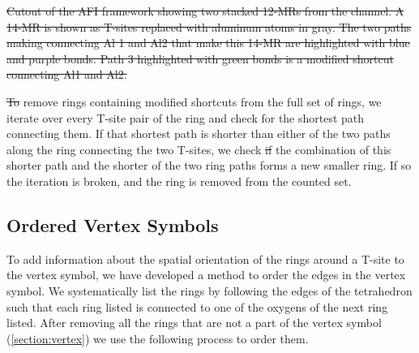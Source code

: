 \documentclass[preprint,numrefs,noinfo,sort&compress]{elsarticle}
\providecommand{\DIFadd}[1]{{\protect\color{blue}\uwave{#1}}} %
\providecommand{\DIFdel}[1]{{\protect\color{red}\sout{#1}}}                      %
\providecommand{\DIFaddbegin}{} %
\providecommand{\DIFaddend}{} %
\providecommand{\DIFdelbegin}{} %
\providecommand{\DIFdelend}{} %
\providecommand{\DIFdelFL}[1]{\DIFdel{#1}} %
\newcommand{\DIFscaledelfig}{0.5}
\newlength{\DIFdelgraphicswidth} %
\newlength{\DIFdelgraphicsheight} %
\newcommand{\DIFaddincludegraphics}[2][]{{\color{blue}\fbox{\DIFOincludegraphics[#1]{#2}}}} %
\newcommand{\DIFdelincludegraphics}[2][]{%
\sbox{\DIFdelgraphicsbox}{\DIFOincludegraphics[#1]{#2}}%
\settoboxwidth{\DIFdelgraphicswidth}{\DIFdelgraphicsbox} %
\settoboxtotalheight{\DIFdelgraphicsheight}{\DIFdelgraphicsbox} %
\scalebox{\DIFscaledelfig}{%
\parbox[b]{\DIFdelgraphicswidth}{\usebox{\DIFdelgraphicsbox}\\[-\baselineskip] \rule{\DIFdelgraphicswidth}{0em}}\llap{\resizebox{\DIFdelgraphicswidth}{\DIFdelgraphicsheight}{%
\setlength{\unitlength}{\DIFdelgraphicswidth}%
\begin{picture}(1,1)%
\thicklines\linethickness{2pt} %
{\color[rgb]{1,0,0}\put(0,0){\framebox(1,1){}}}%
{\color[rgb]{1,0,0}\put(0,0){\line( 1,1){1}}}%
{\color[rgb]{1,0,0}\put(0,1){\line(1,-1){1}}}%
\end{picture}%
}\hspace*{3pt}}} %
} %
\DeclareRobustCommand{\DIFaddbegin}{\DIFOaddbegin \let\includegraphics\DIFaddincludegraphics} %
\DeclareRobustCommand{\DIFaddend}{\DIFOaddend \let\includegraphics\DIFOincludegraphics} %
\DeclareRobustCommand{\DIFdelbegin}{\DIFOdelbegin \let\includegraphics\DIFdelincludegraphics} %
\DeclareRobustCommand{\DIFdelend}{\DIFOaddend \let\includegraphics\DIFOincludegraphics} %
\begin{document}
\DIFdelbegin %
{%
\DIFdelFL{Cutout of the AFI framework showing two stacked 12-MRs from the channel. A 14-MR is shown as T-sites replaced with aluminum atoms in gray. The two paths making connecting Al 1 and Al2 that make this 14-MR are highlighted with blue and purple bonds. Path 3 highlighted with green bonds is a modified shortcut connecting Al1 and Al2. }%
}

\DIFdel{To }\DIFdelend \DIFaddbegin \DIFadd{Algorithmically, to }\DIFaddend remove rings containing modified shortcuts from the full set of rings, we iterate over every T-site pair of the ring and check for the shortest path connecting them. If that shortest path is shorter than either of the two paths along the ring connecting the two T-sites, we check \DIFdelbegin \DIFdel{if }\DIFdelend \DIFaddbegin \DIFadd{whether }\DIFaddend the combination of this shorter path and the shorter of the two ring paths forms a new smaller ring. If so the iteration is broken, and the ring is removed from the counted set. 

\subsection{Ordered Vertex Symbols \label{section:ov}}
\DIFdelbegin %
\DIFdelend \DIFaddbegin \label{sec:org7db42da}
\DIFaddend 

To add information about the spatial orientation of the rings around a T-site to the vertex symbol, we have developed a method to order the edges in the vertex symbol. We systematically list the rings by following the edges of the tetrahedron such that each ring listed is connected to one of the oxygens of the next ring listed. After removing all the rings that are not a part of the vertex symbol (\cref{section:vertex}) we use the following process to order them. 
\end{document}
